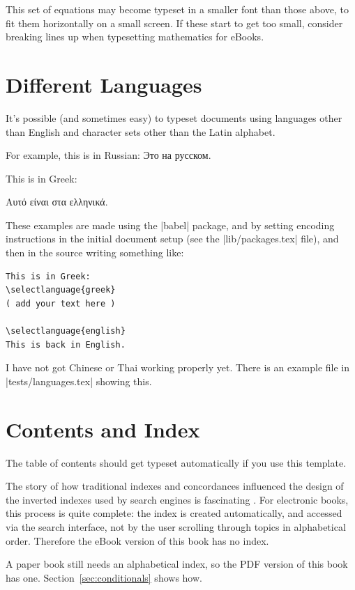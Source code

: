 This set of equations may become typeset in a smaller font than those above, to fit them
horizontally on a small screen. If these start to get too small, consider breaking lines up
when typesetting mathematics for eBooks.

\section{Different Languages}

It's possible (and sometimes easy) to typeset documents using languages other than English
and character sets other than the Latin alphabet.

For example, this is in Russian:
Это на русском.

This is in Greek:

Αυτό είναι στα ελληνικά.

These examples are made using the \sverb|babel| package, and by setting
encoding instructions in the initial document setup (see the \sverb|lib/packages.tex| file),
and then in the \latex source writing something like:

\begin{Verbatim}[fontsize=\footnotesize]
This is in Greek:
\selectlanguage{greek}
( add your text here )

\selectlanguage{english}
This is back in English.
\end{Verbatim}

I have not got Chinese or Thai working properly yet. There is an example file in \sverb|tests/languages.tex|
showing this.

\section{Contents and Index}

The table of contents should get typeset automatically if you use this template.

The story of how traditional indexes and concordances influenced the design of the inverted
indexes used by search engines is fascinating \citep[Ch 1]{witten1999gigabytes}.
For electronic books, this process is quite complete: the index is created automatically,
and accessed via the search interface, not by the user scrolling through topics in alphabetical order.
Therefore the eBook version of this book has no index.

A paper book still needs an alphabetical index, so the PDF version of this book has one.
Section~\ref{sec:conditionals} shows how.

